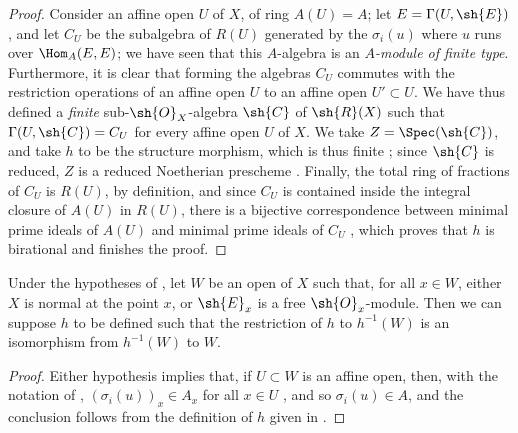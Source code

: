 \begin{proof}
Consider an affine open $U$ of $X$, of ring $A(U)=A$;
let $E=\Gamma(U,\sh{E})$, and let $C_U$ be the subalgebra of $R(U)$ generated by the $\sigma_i(u)$ where $u$ runs over $\Hom_A(E,E)$;
we have seen  that this $A$-algebra is an \emph{$A$-module of finite type}.
Furthermore, it is clear that forming the algebras $C_U$ commutes with the restriction operations of an affine open $U$ to an affine open $U'\subset U$.
We have thus defined a \emph{finite} sub-$\sh{O}_X$-algebra $\sh{C}$ of $\sh{R}(X)$ such that $\Gamma(U,\sh{C})=C_U$ for every affine open $U$ of $X$.
We take $Z=\Spec(\sh{C})$, and take $h$ to be the structure morphism, which is thus finite ;
since $\sh{C}$ is reduced, $Z$ is a reduced Noetherian prescheme .
Finally, the total ring of fractions of $C_U$ is $R(U)$, by definition, and since $C_U$ is contained inside the integral closure of $A(U)$ in $R(U)$, there is a bijective correspondence between minimal prime ideals of $A(U)$ and minimal prime ideals of $C_U$ \cite[t.~I, p.~259]{I-13}, which proves that $h$ is birational and finishes the proof.
\end{proof}

\begin{corollary}[6.6.7]
\label{II.6.6.7}
Under the hypotheses of , let $W$ be an open of $X$ such that, for all $x\in W$, either $X$ is normal at the point $x$, or $\sh{E}_x$ is a free $\sh{O}_x$-module.
Then we can suppose $h$ to be defined such that the restriction of $h$ to $h^{-1}(W)$ is an isomorphism from $h^{-1}(W)$ to $W$.
\end{corollary}

\begin{proof}
Either hypothesis implies that, if $U\subset W$ is an affine open, then, with the notation of , $(\sigma_i(u))_x\in A_x$ for all $x\in U$ , and so $\sigma_i(u)\in A$, and the conclusion follows from the definition of $h$ given in .
\end{proof}

